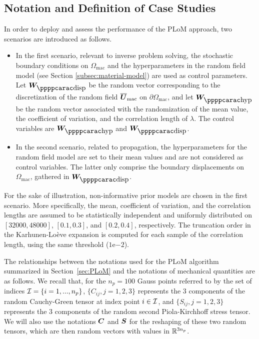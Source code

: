 \subsection{Notation and Definition of Case Studies}
\label{sec:PLoMappli.1}
In order to deploy and assess the performance of the PLoM approach, two scenarios are introduced as follows.
\begin{itemize}
    \item In the first scenario, relevant to inverse problem solving, the stochastic boundary conditions on $\Omega_{\text{mac}}$ and the hyperparameters in the random field model (see Section \ref{subsec:material-model}) are used as control parameters. Let $\bfW_\dispp$ be the random vector corresponding to the discretization of the random field $\overline{{\boldsymbol{U}}}_{\text{mac}}$ on $\partial \Omega_{\text{mac}}$, and let $\bfW_\hypp$ be the random vector associated with the randomization of the mean value, the coefficient of variation, and the correlation length of $\lambda$. The control variables are $\bfW_\hypp$ and $\bfW_\dispp$.
    \item In the second scenario, related to propagation, the hyperparameters for the random field model are set to their mean values and are not considered as control variables. The latter only comprise the boundary displacements on $\Omega_{\text{mac}}$, gathered in $\bfW_\dispp$.
\end{itemize} 
For the sake of illustration, non-informative prior models are chosen in the first scenario. More specifically, the mean, coefficient of variation, and the correlation lengths are assumed to be statistically independent and uniformly distributed on $[32000,48000]$, $[0.1,0.3]$, and $[0.2, 0.4]$, respectively. The truncation order in the Karhunen-Lo\`eve expansion is computed for each sample of the correlation length, using the same threshold ($1\mathrm{e}{-2}$).

%
The relationships between the notations used for the PLoM algorithm summarized in Section~\ref{sec:PLoM} and the notations of mechanical quantities are as follows.
%
We recall that, for the $n_p = 100$ Gauss points referred to by the set of indices ${\mathcal{I}} = \{i=1,...,n_p\}$, $\{C_{ij}, j=1,2,3\}$ represents the $3$ components of the random Cauchy-Green tensor at index point $i\in{\mathcal{I}}$, and $\{S_{ij}, j=1,2,3\}$ represents the $3$ components of the random second Piola-Kirchhoff stress tensor. We will also use the notations ${\boldsymbol{C}}$ and ${\boldsymbol{S}}$ for the reshaping of these two random tensors, which are then random vectors with values in ${\mathbb{R}}^{3n_p}$.\\ 

